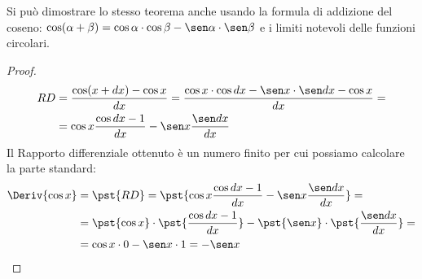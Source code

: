 \begin{osservazione}
Si può dimostrare lo stesso teorema anche usando la formula di addizione 
del coseno:
\(\cos(\alpha+\beta) = 
\cos \alpha \cdot \cos \beta - \sen \alpha \cdot \sen \beta\) e 
i limiti notevoli delle funzioni circolari.
\begin{proof}
\begin{align*}
RD &= \dfrac{\cos(x+dx)-\cos x}{dx} =
      \dfrac{\cos x \cdot \cos dx - \sen x \cdot \sen dx - \cos x}{dx} = \\
   &= \cos x \dfrac{\cos dx -1}{dx} - \sen x \dfrac{\sen dx}{dx}
\end{align*}
Il Rapporto differenziale ottenuto è un numero finito per cui possiamo 
calcolare la parte standard:
\begin{align*}
\Deriv{\cos x} &= \pst{RD} = 
    \pst{\cos x \dfrac{\cos dx -1}{dx} - \sen x \dfrac{\sen dx}{dx}} = \\
&=  \pst{\cos x} \cdot \pst{\dfrac{\cos dx-1}{dx}} - 
    \pst{\sen x} \cdot \pst{\dfrac{\sen dx}{dx}} = \\
&=  \cos x \cdot 0 - \sen x \cdot 1 = -\sen x
\end{align*}
\end{proof}
% 
\end{osservazione}

